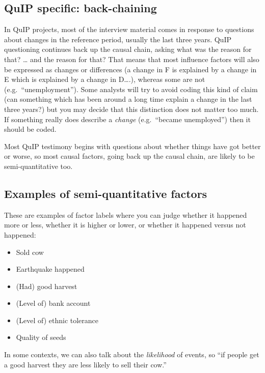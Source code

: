 \documentclass[
]{book}
\providecommand{\tightlist}{%
  \setlength{\itemsep}{0pt}\setlength{\parskip}{0pt}}
\begin{document}
\hypertarget{quip-specific-back-chaining}{%
\subsection{QuIP specific: back-chaining}\label{quip-specific-back-chaining}}

In QuIP projects, most of the interview material comes in response to questions about changes in the reference period, usually the last three years. QuIP questioning continues back up the causal chain, asking what was the reason for that? \ldots{} and the reason for that? That means that most influence factors will also be expressed as changes or differences (a change in F is explained by a change in E which is explained by a change in D\ldots.), whereas some are not (e.g.~``unemployment''). Some analysts will try to avoid coding this kind of claim (can something which has been around a long time explain a change in the last three years?) but you may decide that this distinction does not matter too much. If something really does describe a \emph{change} (e.g.~``became unemployed'') then it should be coded.

Most QuIP testimony begins with questions about whether things have got better or worse, so most causal factors, going back up the causal chain, are likely to be semi-quantitative too.

\hypertarget{examples-of-semi-quantitative-factors}{%
\subsection{Examples of semi-quantitative factors}\label{examples-of-semi-quantitative-factors}}

These are examples of factor labels where you can judge whether it happened more or less, whether it is higher or lower, or whether it happened versus not happened:

\begin{itemize}
\tightlist
\item
  Sold cow
\item
  Earthquake happened
\item
  (Had) good harvest
\item
  (Level of) bank account
\item
  (Level of) ethnic tolerance
\item
  Quality of seeds
\end{itemize}

In some contexts, we can also talk about the \emph{likelihood} of events, so ``if people get a good harvest they are less likely to sell their cow.''
\end{document}
